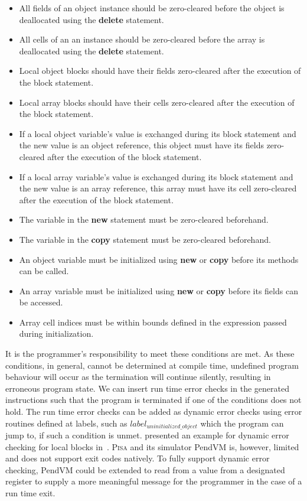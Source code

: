 \begin{itemize}
    \item All fields of an object instance should be zero-cleared before the object is deallocated using the \textbf{delete} statement.
    \item All cells of an an instance should be zero-cleared before the array is deallocated using the \textbf{delete} statement.
    \item Local object blocks should have their fields zero-cleared after the execution of the block statement.
    \item Local array blocks should have their cells zero-cleared after the execution of the block statement.
    \item If a local object variable's value is exchanged during its block statement and the new value is an object reference, this object must have its fields zero-cleared after the execution of the block statement.
    \item If a local array variable's value is exchanged during its block statement and the new value is an array reference, this array must have its cell zero-cleared after the execution of the block statement.
    \item The variable in the \textbf{new} statement must be zero-cleared beforehand.
    \item The variable in the \textbf{copy} statement must be zero-cleared beforehand.
    \item An object variable must be initialized using \textbf{new} or \textbf{copy} before its methods can be called.
    \item An array variable must be initialized using \textbf{new} or \textbf{copy} before its fields can be accessed.
    \item Array cell indices must be within bounds defined in the expression passed during initialization. 
\end{itemize}

It is the programmer's responsibility to meet these conditions are met. As these conditions, in general, cannot be determined at compile time, undefined program behaviour will occur as the termination will continue silently, resulting in erroneous program state. We can insert run time error checks in the generated instructions such that the program is terminated if one of the conditions does not hold. The run time error checks can be added as dynamic error checks using error routines defined at labels, such as $label_{uninitialized\_object}$ which the program can jump to, if such a condition is unmet. \citeauthor{th:roopl} presented an example for dynamic error checking for local blocks in~\cite{th:roopl}. \textsc{Pisa} and its simulator PendVM is, however, limited and does not support exit codes natively. To fully support dynamic error checking, PendVM could be extended to read from a value from a designated register to supply a more meaningful message for the programmer in the case of a run time exit.
 
